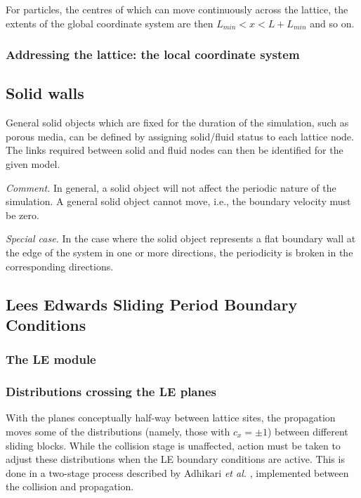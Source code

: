 For particles, the centres of which can move continuously across the
lattice, the extents of the global coordinate system are then
$L_{min} < x < L + L_{min}$ and so on.

\subsubsection{Addressing the lattice: the local coordinate system}


\subsection{Solid walls}

General solid objects which are fixed for the duration of
the simulation, such as porous media, can be defined
by assigning solid/fluid status to each lattice node. 
The links required between solid and fluid nodes can
then be identified for the given model.

\textit{Comment.} In general, a solid object will not
affect the periodic nature of the simulation. A general
solid object cannot move, i.e., the boundary velocity
must be zero.

\textit{Special case.} In the case where the solid object
represents a flat boundary wall at the edge of the system
in one or more directions, the periodicity is broken in
the corresponding directions.




\subsection{Lees Edwards Sliding Period Boundary Conditions}

\subsubsection{The LE module}

\subsubsection{Distributions crossing the LE planes}

With the planes conceptually half-way between lattice sites, the
propagation moves some of the distributions (namely, those with
$c_x = \pm1$) between different sliding blocks. While the collision
stage is unaffected, action must be taken to adjust these
distributions when the LE boundary conditions are active. This
is done in a two-stage process described by Adhikari \textit{et al.}
\cite{adhikari_desplat}, implemented between the collision and
propagation.

